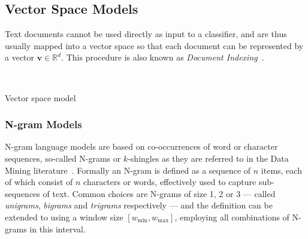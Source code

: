 


\subsection{Vector Space Models}

Text documents cannot be used directly as input to a classifier, and are thus usually mapped into a vector space so that each document can be represented by a vector $\mathbf{v} \in \mathbb{R}^d$. This procedure is also known as \emph{Document Indexing}~\cite{Sebastiani:2002aa}.


~\cite[Chapter 14, p.~289]{Manning:2008aa}

Vector space model~\cite[Chapter 6.3, p.~120]{Manning:2008aa}

\cite[Chapter 6.2, p.~117]{Manning:2008aa}


\subsubsection{N-gram Models}
\label{subs:N-gram Models}

N-gram language models are based on co-occurrences of word or character sequences, so-called N-grams or $k$-shingles as they are referred to in the Data Mining literature~\cite[Chapter 3.2, p.~72]{Leskovec:2014aa}. Formally an N-gram is defined as a sequence of $n$ items, each of which consist of $n$ characters or words, effectively used to capture sub-sequences of text. Common choices are N-grams of size 1, 2 or 3 --- called \emph{unigrams}, \emph{bigrams} and \emph{trigrams} respectively --- and the definition can be extended to using a window size $[\textit{w}_{\text{min}}, \textit{w}_{\text{max}}]$, employing all combinations of N-grams in this interval.

